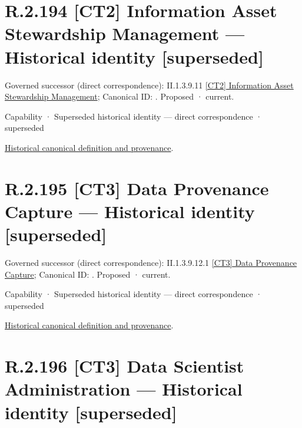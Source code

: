 \section*{R.2.194 [CT2] Information Asset Stewardship Management — Historical identity [superseded]}
\label{navigation:R.2.194}

{\small Governed successor (direct correspondence): II.1.3.9.11 \hyperref[element:5bac15316d8d4f4db6e7a253f1acfbe3]{[CT2] Information Asset Stewardship Management}; Canonical ID: \texttt{}. Proposed · current.}\par
\label{element:cee085c690314802851de71f4741d8db}
{\small Capability · Superseded historical identity — direct correspondence · superseded}\par
\href{../../../../../../../continuum/strategy/capability/cee085c690314802851de71f4741d8db.md}{Historical canonical definition and provenance}.\par
\section*{R.2.195 [CT3] Data Provenance Capture — Historical identity [superseded]}
\label{navigation:R.2.195}

{\small Governed successor (direct correspondence): II.1.3.9.12.1 \hyperref[element:44a7937520a54945b06b5fd4a2bbd870]{[CT3] Data Provenance Capture}; Canonical ID: \texttt{}. Proposed · current.}\par
\label{element:61258c7fe41f4541871a67ec9d7185cf}
{\small Capability · Superseded historical identity — direct correspondence · superseded}\par
\href{../../../../../../../continuum/strategy/capability/61258c7fe41f4541871a67ec9d7185cf.md}{Historical canonical definition and provenance}.\par
\section*{R.2.196 [CT3] Data Scientist Administration — Historical identity [superseded]}
\label{navigation:R.2.196}

